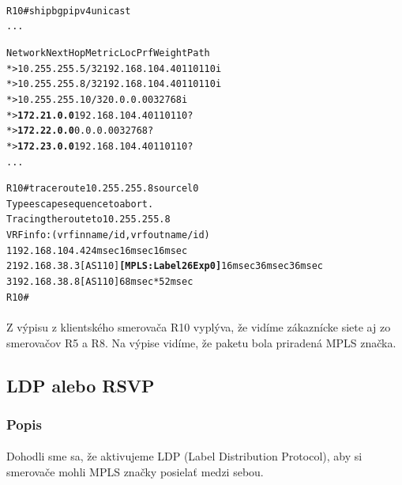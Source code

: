 \documentclass[12pt,twoside,a4paper]{report}
\begin{document}
\paragraph{}
\noindent
{\selectfont
\begin{small}
\begin{alltt}
R10#sh ip bgp ipv4 unicast
...

     Network          Next Hop            Metric LocPrf Weight Path
 *>  10.255.255.5/32  192.168.104.4                          0 110 110 i
 *>  10.255.255.8/32  192.168.104.4                          0 110 110 i
 *>  10.255.255.10/32 0.0.0.0                  0         32768 i
 *>  \textbf{172.21.0.0}       192.168.104.4                          0 110 110 ?
 *>  \textbf{172.22.0.0}       0.0.0.0                  0         32768 ?
 *>  \textbf{172.23.0.0}       192.168.104.4                          0 110 110 ?
...




R10#traceroute 10.255.255.8 source l0
Type escape sequence to abort.
Tracing the route to 10.255.255.8
VRF info: (vrf in name/id, vrf out name/id)
  1 192.168.104.4 24 msec 16 msec 16 msec
  2 192.168.38.3 [AS 110] \textbf{[MPLS: Label 26 Exp 0]} 16 msec 36 msec 36 msec
  3 192.168.38.8 [AS 110] 68 msec *  52 msec
R10#

\end{alltt}
\end{small}
}

\paragraph{}
Z výpisu  z klientského smerovača R10 vyplýva, že vidíme zákaznícke siete aj zo smerovačov R5 a R8. Na výpise  vidíme, že paketu bola priradená MPLS značka.




\subsection{LDP alebo RSVP}
\subsubsection{Popis}
\paragraph{}
Dohodli sme sa, že aktivujeme LDP (Label Distribution Protocol), aby si smerovače mohli MPLS značky posielať medzi sebou.
\end{document}
